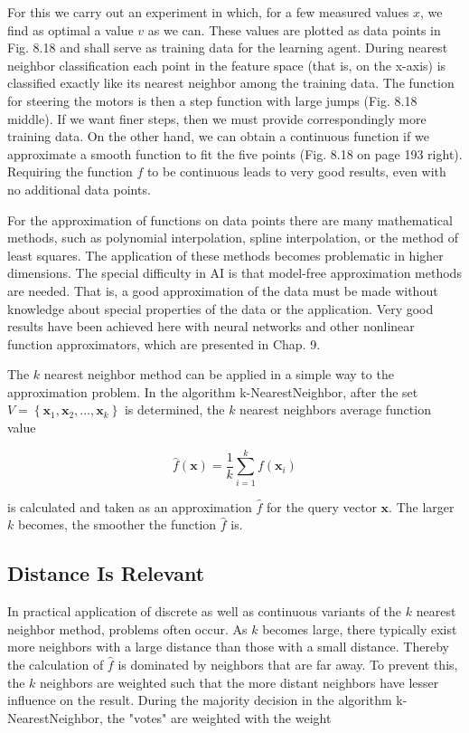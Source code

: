 \documentclass[10pt]{book}
\begin{document}
For this we carry out an experiment in which, for a few measured values $x$, we find as optimal a value $v$ as we can. These values are plotted as data points in Fig. 8.18 and shall serve as training data for the learning agent. During nearest neighbor classification each point in the feature space (that is, on the x-axis) is classified exactly like its nearest neighbor among the training data. The function for steering the motors is then a step function with large jumps (Fig. 8.18 middle). If we want finer steps, then we must provide correspondingly more training data. On the other hand, we can obtain a continuous function if we approximate a smooth function to fit the five points (Fig. 8.18 on page 193 right). Requiring the function $f$ to be continuous leads to very good results, even with no additional data points.

For the approximation of functions on data points there are many mathematical methods, such as polynomial interpolation, spline interpolation, or the method of least squares. The application of these methods becomes problematic in higher dimensions. The special difficulty in AI is that model-free approximation methods are needed. That is, a good approximation of the data must be made without knowledge about special properties of the data or the application. Very good results have been achieved here with neural networks and other nonlinear function approximators, which are presented in Chap. 9.

The $k$ nearest neighbor method can be applied in a simple way to the approximation problem. In the algorithm k-NearestNeighbor, after the set $V=\left\{\boldsymbol{x}_{1}, \boldsymbol{x}_{2}, \ldots, \boldsymbol{x}_{k}\right\}$ is determined, the $k$ nearest neighbors average function value

\begin{equation*}
\hat{f}(\boldsymbol{x})=\frac{1}{k} \sum_{i=1}^{k} f\left(\boldsymbol{x}_{i}\right) \tag{8.2}
\end{equation*}

is calculated and taken as an approximation $\hat{f}$ for the query vector $\boldsymbol{x}$. The larger $k$ becomes, the smoother the function $\hat{f}$ is.

\subsection{Distance Is Relevant}
In practical application of discrete as well as continuous variants of the $k$ nearest neighbor method, problems often occur. As $k$ becomes large, there typically exist more neighbors with a large distance than those with a small distance. Thereby the calculation of $\hat{f}$ is dominated by neighbors that are far away. To prevent this, the $k$ neighbors are weighted such that the more distant neighbors have lesser influence on the result. During the majority decision in the algorithm k-NearestNeighbor, the "votes" are weighted with the weight
\end{document}
